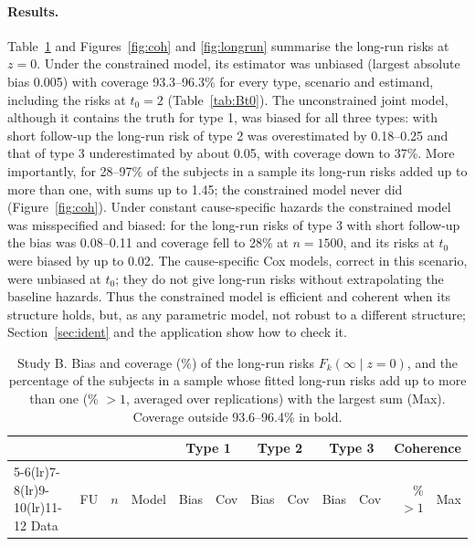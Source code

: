 \documentclass[11pt]{article}
\begin{document}
\paragraph{Results.} Table~\ref{tab:B} and Figures~\ref{fig:coh} and \ref{fig:longrun}
summarise the long-run risks at $z = 0$. Under the constrained model, its estimator was
unbiased (largest absolute bias 0.005) with coverage 93.3--96.3\% for every type, scenario and
estimand, including the risks at $t_0 = 2$ (Table~\ref{tab:Bt0}). The unconstrained joint model, although
it contains the truth for type 1, was biased for all three types: with short follow-up the
long-run risk of type 2 was overestimated by 0.18--0.25 and that of type 3 underestimated by about
0.05, with coverage down to 37\%. More importantly, for 28--97\% of the subjects in a sample its
long-run risks added up to more than one, with sums up to 1.45; the constrained model never did
(Figure~\ref{fig:coh}). Under constant cause-specific hazards the constrained model was misspecified
and biased: for the long-run risks of type 3 with short follow-up the bias was 0.08--0.11 and
coverage fell to 28\% at $n = 1500$, and its risks at $t_0$ were biased by up to 0.02. The
cause-specific Cox models, correct in this scenario, were unbiased at $t_0$; they do not give long-run
risks without extrapolating the baseline hazards. Thus the constrained model is efficient and
coherent when its structure holds, but, as any parametric model, not robust to a different
structure; Section~\ref{sec:ident} and the application show how to check it.

\begin{table}[tbp]
\centering\scriptsize
\caption{Study B. Bias and coverage (\%) of the long-run risks $F_k(\infty \mid z = 0)$, and the
percentage of the subjects in a sample whose fitted long-run risks add up to more than one
(\% $>1$, averaged over replications) with the largest sum (Max). Coverage outside 93.6--96.4\% in
bold.}
\label{tab:B}
\setlength{\tabcolsep}{3.5pt}
\begin{tabular}{llll rr rr rr rr}
\toprule
 & & & & \multicolumn{2}{c}{Type 1} & \multicolumn{2}{c}{Type 2} & \multicolumn{2}{c}{Type 3} & \multicolumn{2}{c}{Coherence}\\
\cmidrule(lr){5-6}\cmidrule(lr){7-8}\cmidrule(lr){9-10}\cmidrule(lr){11-12}
Data & FU & $n$ & Model & Bias & Cov & Bias & Cov & Bias & Cov & \% $>1$ & Max \\
\midrule

\end{tabular}
\end{table}
\end{document}
